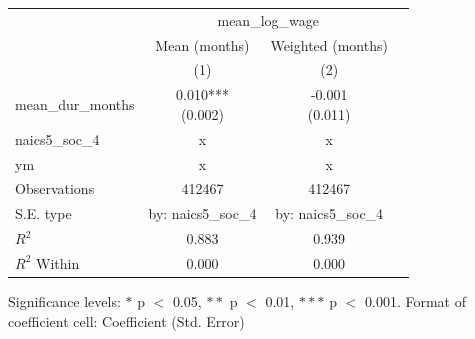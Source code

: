 \renewcommand\cellalign{t}
\begin{threeparttable}
\begin{tabular}{lccc}
\toprule
 & \multicolumn{2}{c}{mean_log_wage} \\
\cmidrule(lr){2-3} 
 & Mean (months) & Weighted (months) \\
 & (1) & (2) \\
\midrule
\addlinespace
mean_dur_months & \makecell{0.010*** \\ (0.002)} & \makecell{-0.001 \\ (0.011)} \\
\midrule
\addlinespace
naics5_soc_4 & x & x \\
ym & x & x \\
\midrule
\addlinespace
Observations & 412467 & 412467 \\
S.E. type & by: naics5_soc_4 & by: naics5_soc_4 \\
$R^2$ & 0.883 & 0.939 \\
$R^2$ Within & 0.000 & 0.000 \\
\bottomrule
\end{tabular}
\footnotesize Significance levels: $*$ p $<$ 0.05, $**$ p $<$ 0.01, $***$ p $<$ 0.001. Format of coefficient cell: Coefficient 
 (Std. Error)
\end{threeparttable}